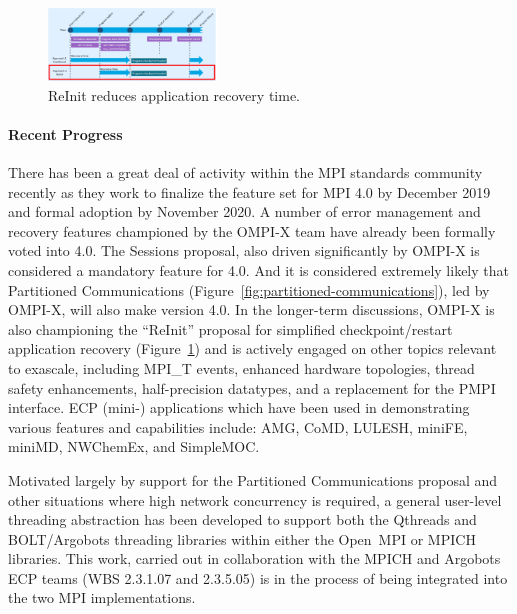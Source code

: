 \begin{figure}
\includegraphics[width=0.40\textwidth]{projects/2.3.1-PMR/2.3.1.17-OMPI-X/reinit.png}
\caption{ReInit reduces application recovery time.}
\label{fig:reinit}
\end{figure}

\paragraph{Recent Progress}
There has been a great deal of activity within the MPI standards community recently
as they work to finalize the feature set for MPI 4.0 by December 2019 and
formal adoption by November 2020.  A number of error management and recovery features
championed by the OMPI-X team have already been formally voted into 4.0.  The Sessions proposal,
also driven significantly by OMPI-X is considered a mandatory feature
for 4.0.  And it is considered extremely likely that Partitioned
Communications (Figure~\ref{fig:partitioned-communications}), led by
OMPI-X, will also make version 4.0. 
In the longer-term discussions, OMPI-X is also championing the
``ReInit'' proposal for simplified checkpoint/restart application
recovery (Figure~\ref{fig:reinit}) and is actively engaged on other topics relevant to
exascale, including MPI\_T events, enhanced hardware topologies, thread safety enhancements, half-precision datatypes, and a replacement for the PMPI interface.  ECP (mini-) applications which have been used in demonstrating various features and capabilities include: AMG, CoMD, LULESH, miniFE, miniMD, NWChemEx, and SimpleMOC.

Motivated largely by support for the Partitioned Communications proposal and other situations where high network concurrency is required, a general user-level threading abstraction has been developed to support both the Qthreads and BOLT/Argobots threading libraries within either the Open~MPI or MPICH libraries.  This work, carried out in collaboration with the MPICH and Argobots ECP teams (WBS 2.3.1.07 and 2.3.5.05) is in the process of being integrated into the two MPI implementations.

